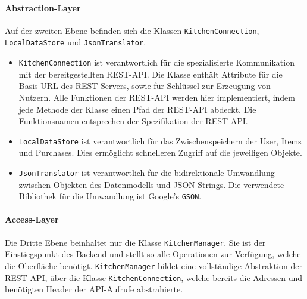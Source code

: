 \documentclass{scrartcl}
\begin{document}
			\paragraph*{Abstraction-Layer}
			Auf der zweiten Ebene befinden sich die Klassen \texttt{KitchenConnection}, \texttt{LocalDataStore} und \texttt{JsonTranslator}.
			
			\begin{itemize}
				\item  \texttt{KitchenConnection} ist verantwortlich für die spezialisierte Kommunikation mit der bereitgestellten REST-API. Die Klasse enthält Attribute für die Basis-URL des REST-Servers, sowie für Schlüssel zur Erzeugung von Nutzern. Alle Funktionen der REST-API werden hier implementiert, indem jede Methode der Klasse einen Pfad der REST-API abdeckt. Die Funktionsnamen entsprechen der Spezifikation der REST-API.
				
				\item \texttt{LocalDataStore} ist verantwortlich für das Zwischenspeichern der User, Items und Purchases. Dies ermöglicht schnelleren Zugriff auf die jeweiligen Objekte.
				
				\item \texttt{JsonTranslator} ist verantwortlich für die bidirektionale Umwandlung zwischen Objekten des Datenmodells und JSON-Strings. Die verwendete Bibliothek für die Umwandlung ist Google's \texttt{GSON}.
			\end{itemize}
		
			\paragraph*{Access-Layer}
			Die Dritte Ebene beinhaltet nur die Klasse \texttt{KitchenManager}. Sie ist der Einstiegspunkt des Backend und stellt so alle Operationen zur Verfügung, welche die Oberfläche benötigt. \texttt{KitchenManager} bildet eine vollständige Abstraktion der REST-API, über die Klasse \texttt{KitchenConnection}, welche bereits die Adressen und benötigten Header der API-Aufrufe abstrahierte.
		
\end{document}
